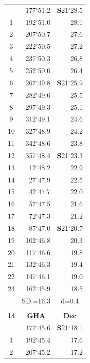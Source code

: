 \documentclass[10pt, a4paper]{report}
\begin{document}
\begin{scriptsize}
\begin{tabular*}{0.2\textwidth}[t]{@{\extracolsep{\fill}}|c|rr|}
\hline\rule{0pt}{2.6ex}\noindent
0 & 177$^\circ$51.2 & \textbf{S}21$^\circ$28.5\\
1 & 192$^\circ$51.0 & 28.1\\
2 & 207$^\circ$50.7 & 27.6\\
3 & 222$^\circ$50.5 & \raisebox{0.24ex}{\boldmath$\cdot$~\boldmath$\cdot$~~}27.2\\
4 & 237$^\circ$50.3 & 26.8\\
5 & 252$^\circ$50.0 & 26.4\\[2Pt]
6 & 267$^\circ$49.8 & \textbf{S}21$^\circ$25.9\\
7 & 282$^\circ$49.6 & 25.5\\
8 & 297$^\circ$49.3 & 25.1\\
9 & 312$^\circ$49.1 & \raisebox{0.24ex}{\boldmath$\cdot$~\boldmath$\cdot$~~}24.6\\
10 & 327$^\circ$48.9 & 24.2\\
11 & 342$^\circ$48.6 & 23.8\\[2Pt]
12 & 357$^\circ$48.4 & \textbf{S}21$^\circ$23.3\\
13 & 12$^\circ$48.2 & 22.9\\
14 & 27$^\circ$47.9 & 22.5\\
15 & 42$^\circ$47.7 & \raisebox{0.24ex}{\boldmath$\cdot$~\boldmath$\cdot$~~}22.0\\
16 & 57$^\circ$47.5 & 21.6\\
17 & 72$^\circ$47.3 & 21.2\\[2Pt]
18 & 87$^\circ$47.0 & \textbf{S}21$^\circ$20.7\\
19 & 102$^\circ$46.8 & 20.3\\
20 & 117$^\circ$46.6 & 19.8\\
21 & 132$^\circ$46.3 & \raisebox{0.24ex}{\boldmath$\cdot$~\boldmath$\cdot$~~}19.4\\
22 & 147$^\circ$46.1 & 19.0\\
23 & 162$^\circ$45.9 & 18.5\\
\hline
\rule{0pt}{2.4ex} & \multicolumn{1}{c}{SD.=16.3} & \multicolumn{1}{c|}{d=0.4}\\
\hline
\multicolumn{1}{c}{}\\[-0.5ex]\hline
\multicolumn{1}{|c|}{\rule{0pt}{2.6ex}\textbf{14}} & \multicolumn{1}{c}{\textbf{GHA}} & \multicolumn{1}{c|}{\textbf{Dec}}\\
\hline\rule{0pt}{2.6ex}\noindent
0 & 177$^\circ$45.6 & \textbf{S}21$^\circ$18.1\\
1 & 192$^\circ$45.4 & 17.6\\
2 & 207$^\circ$45.2 & 17.2\\

\end{tabular*}
\end{scriptsize}
\end{document}
